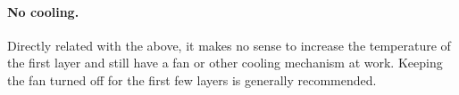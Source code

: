 \paragraph{No cooling.} %
\label{par:no_cooling}
Directly related with the above, it makes no sense to increase the temperature of the first layer and still have a fan or other cooling mechanism at work.  Keeping the fan turned off for the first few layers is generally recommended.
